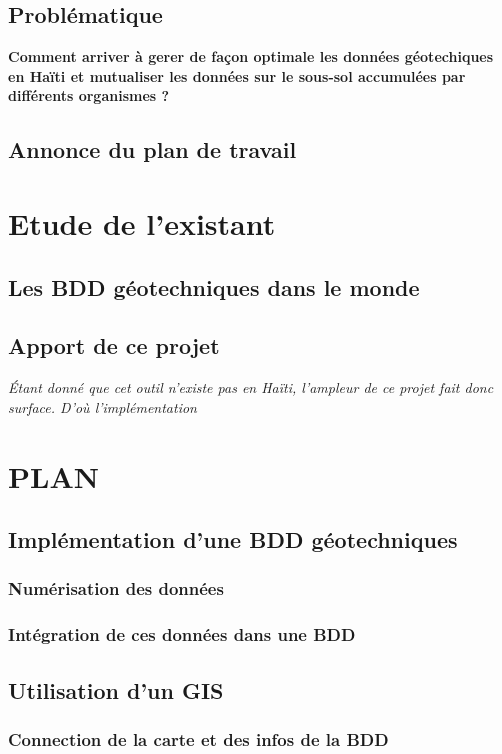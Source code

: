     \subsection{Problématique}
    \textbf{Comment arriver à gerer de façon optimale les données géotechiques en Haïti et 
    mutualiser les données sur le sous-sol accumulées par différents organismes ?}
    \subsection{Annonce du plan de travail}

\section{Etude de l'existant}
    \subsection{Les BDD géotechniques dans le monde}
    \subsection{Apport de ce projet}
    \textit{Étant donné que cet outil n'existe pas 
    en Haïti, l'ampleur de ce projet fait donc surface.
    D'où l'implémentation}

\section{PLAN}
    \subsection{Implémentation d'une BDD géotechniques}
        \subsubsection{Numérisation des données}
        \subsubsection{Intégration de ces données dans une BDD}
    \subsection{Utilisation d'un GIS}
        \subsubsection{Connection de la carte et des infos de la BDD}
